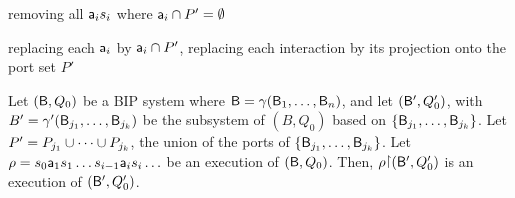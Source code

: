 \item \label{def.clause.bip.execution.projection.action} removing all $\mathsf{a}_i s_i$ where $\mathsf{a}_i \cap P' = \emptyset$   %

\item \label{def.clause.bip.execution.projection.port} replacing each $\mathsf{a}_i$ by $\mathsf{a}_i \cap P'$, \ie replacing each
interaction by its projection onto the port set $P'$ 

\en
\ed



\label{prop.bip.execution.projection}
Let $(\mathsf{B}, Q_0)$ be a BIP system where $\mathsf{B} = \gamma(\mathsf{B}_1,\dots,\mathsf{B}_n)$, and let
$(\mathsf{B}', Q'_0)$, with $B' = \gamma'(\mathsf{B}_{j_1},\dots,\mathsf{B}_{j_k})$ be 
the subsystem of $(B, Q_0)$ based on $\{ \mathsf{B}_{j_1},\dots,\mathsf{B}_{j_k} \}$.
Let $P' = P_{j_1} \cup \cdots \cup P_{j_k}$,  \ie the union of the ports of $\{ \mathsf{B}_{j_1},\dots,\mathsf{B}_{j_k} \}$.
Let $\rho = s_0 \mathsf{a}_1 s_1 \ldots s_{i-1} \mathsf{a}_i s_i \ldots$ be an execution of $(\mathsf{B}, Q_0)$. 
Then, $\rho \pj (\B', Q'_0)$ is an execution of $(\mathsf{B}', Q'_0)$.
\ep
